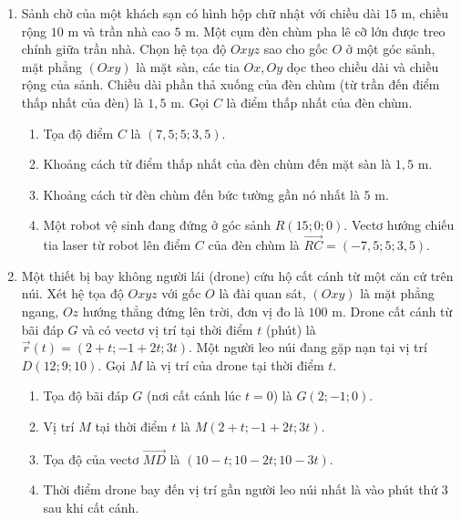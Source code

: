 \documentclass[12pt]{article}
\begin{document}
\begin{enumerate}[label=\textbf{Câu \arabic*:}, leftmargin=*]
		\vspace{3mm}
		\item Sảnh chờ của một khách sạn có hình hộp chữ nhật với chiều dài $15\text{ m}$, chiều rộng $10\text{ m}$ và trần nhà cao $5\text{ m}$. Một cụm đèn chùm pha lê cỡ lớn được treo chính giữa trần nhà. Chọn hệ tọa độ $Oxyz$ sao cho gốc $O$ ở một góc sảnh, mặt phẳng $(Oxy)$ là mặt sàn, các tia $Ox, Oy$ dọc theo chiều dài và chiều rộng của sảnh. Chiều dài phần thả xuống của đèn chùm (từ trần đến điểm thấp nhất của đèn) là $1,5\text{ m}$. Gọi $C$ là điểm thấp nhất của đèn chùm.
		\begin{enumerate}[label=\alph*)]
			\item Tọa độ điểm $C$ là $(7,5; 5; 3,5)$.
			\item Khoảng cách từ điểm thấp nhất của đèn chùm đến mặt sàn là $1,5\text{ m}$.
			\item Khoảng cách từ đèn chùm đến bức tường gần nó nhất là $5\text{ m}$.
			\item Một robot vệ sinh đang đứng ở góc sảnh $R(15; 0; 0)$. Vectơ hướng chiếu tia laser từ robot lên điểm $C$ của đèn chùm là $\overrightarrow{RC} = (-7,5; 5; 3,5)$.
		\end{enumerate}
		
		\vspace{3mm}
		\item Một thiết bị bay không người lái (drone) cứu hộ cất cánh từ một căn cứ trên núi. Xét hệ tọa độ $Oxyz$ với gốc $O$ là đài quan sát, $(Oxy)$ là mặt phẳng ngang, $Oz$ hướng thẳng đứng lên trời, đơn vị đo là $100\text{ m}$. Drone cất cánh từ bãi đáp $G$ và có vectơ vị trí tại thời điểm $t$ (phút) là $\vec{r}(t) = (2+t; -1+2t; 3t)$. Một người leo núi đang gặp nạn tại vị trí $D(12; 9; 10)$. Gọi $M$ là vị trí của drone tại thời điểm $t$.
		\begin{enumerate}[label=\alph*)]
			\item Tọa độ bãi đáp $G$ (nơi cất cánh lúc $t=0$) là $G(2; -1; 0)$.
			\item Vị trí $M$ tại thời điểm $t$ là $M(2+t; -1+2t; 3t)$.
			\item Tọa độ của vectơ $\overrightarrow{MD}$ là $(10-t; 10-2t; 10-3t)$.
			\item Thời điểm drone bay đến vị trí gần người leo núi nhất là vào phút thứ 3 sau khi cất cánh.
		\end{enumerate}
		

\end{enumerate}
\end{document}
